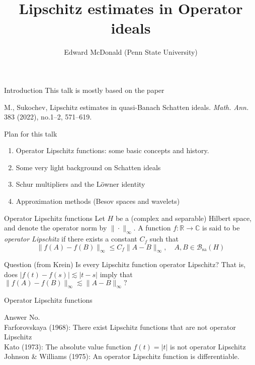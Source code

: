 \documentclass{beamer}
\newcommand\makebeamertitle{\frame{\maketitle}}%
\numberwithin{equation}{section}
\theoremstyle{plain}
\theoremstyle{plain}
\theoremstyle{definition}
\theoremstyle{plain}
\theoremstyle{plain}
\theoremstyle{definition}
\newcommand{\Rl}{\mathbb{R}}
\newcommand{\Cplx}{\mathbb{C}}
\newcommand{\Bc}{\mathcal{B}}
\newcommand{\sa}{\mathrm{sa}}
\begin{document}
\title[Lipschitz estimates for operators]{Lipschitz estimates in Operator ideals}


\author[E. McDonald]{Edward McDonald (Penn State University)}





\makebeamertitle


\begin{frame}{Introduction}
    This talk is mostly based on the paper
    \begin{center}
    M., Sukochev, Lipschitz estimates in quasi-Banach Schatten ideals.
    \emph{Math. Ann.} 383 (2022), no.1--2, 571--619.
    \end{center}
\end{frame}

\begin{frame}{Plan for this talk}
    \begin{enumerate}
        \item{} Operator Lipschitz functions: some basic concepts and history.
        \item{} Some very light background on Schatten ideals
        \item{} Schur multipliers and the L\"owner identity
        \item{} Approximation methods (Besov spaces and wavelets)
    \end{enumerate}
\end{frame}

\begin{frame}{Operator Lipschitz functions}
    Let $H$ be a (complex and separable) Hilbert space, and denote
    the operator norm by $\|\cdot\|_\infty$. A function $f:\Rl\to \Cplx$
    is said to be \emph{operator Lipschitz} if there exists a constant $C_f$ such that
    \begin{equation*}
        \|f(A)-f(B)\|_\infty \leq C_f\|A-B\|_\infty,\quad A,B\in \Bc_{\sa}(H)
    \end{equation*}
    \begin{block}{Question (from Krein)}
        Is every Lipschitz function operator Lipschitz?
        \pause
        That is, does $|f(t)-f(s)|\lesssim |t-s|$ imply that $\|f(A)-f(B)\|_{\infty} \lesssim \|A-B\|_{\infty}?$
    \end{block}
\end{frame}


\begin{frame}{Operator Lipschitz functions}
    \begin{block}{Answer}
        No.\\\pause
        Farforovskaya (1968): There exist Lipschitz functions that are not operator Lipschitz\\\pause
        Kato (1973): The absolute value function $f(t) = |t|$ is not operator Lipschitz\\\pause
        Johnson \& Williams (1975): An operator Lipschitz function is differentiable.
    \end{block}
\end{frame}
\end{document}
